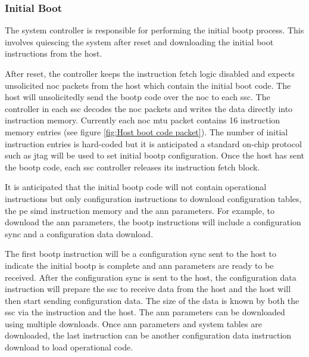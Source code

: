 \subsubsection{Initial Boot}
\label{sec:Initial Boot}

The system controller is responsible for performing the initial \ac{bootp} process.
This involves quiescing the system after reset and downloading the initial boot instructions from the host.

After reset, the controller keeps the instruction fetch logic disabled and expects unsolicited \ac{noc} packets from the host which contain the initial boot code.
The host will unsolicitedly send the \ac{bootp} code over the \ac{noc} to each \ac{ssc}.
The controller in each \ac{ssc} decodes the \ac{noc} packets and writes the data directly into instruction memory.
Currently each \ac{noc} \ac{mtu} packet contains 16 instruction memory entries (see figure \ref{fig:Host boot code packet}).
The number of initial instruction entries is hard-coded but it is anticipated a standard on-chip protocol such as \ac{jtag} will be used to set initial \ac{bootp} configuration.
Once the host has sent the \ac{bootp} code, each \ac{ssc} controller releases its instruction fetch block.

It is anticipated that the initial \ac{bootp} code will not contain operational instructions but only configuration instructions to download configuration tables, the \ac{pe} \ac{simd} instruction memory and the \ac{ann} parameters.
For example, to download the \ac{ann} parameters, the \ac{bootp} instructions will include a configuration sync and a configuration data download.

The first \ac{bootp} instruction will be a configuration sync sent to the host to indicate the initial \ac{bootp} is complete and \ac{ann} parameters are ready to be received.
After the configuration sync is sent to the host, the configuration data instruction will prepare the \ac{ssc} to receive data from the host and the host will then start sending configuration data. 
The size of the data is known by both the \ac{ssc} via the instruction and the host.
The \ac{ann} parameters can be downloaded using multiple downloads.
Once \ac{ann} parameters and system tables are downloaded, the last instruction can be another configuration data instruction download to load operational code.

